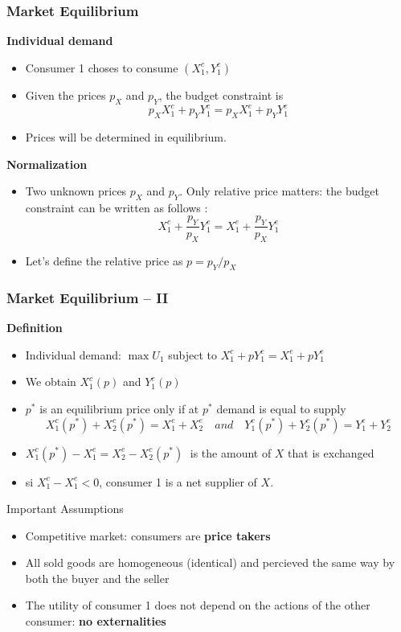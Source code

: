 \documentclass[handout]{beamer}
\newenvironment{iPar}[1]{\textbf{#1} \begin{itemize}}{\end{itemize}}
\newcommand{\mdp}{\medskip \pause}
\begin{document}
\begin{frame}\frametitle{Market Equilibrium}

\begin{iPar}{Individual demand} \item Consumer 1 choses to consume $(X_1^c, Y_1^c)$  \item Given the prices $p_X$ and $p_Y$, the budget constraint is $$  p_X X_1^c + p_Y Y_1^c  =  p_X X_1^e + p_Y Y_1^e$$
\item Prices will be determined in equilibrium.
\end{iPar}\mdp

\begin{iPar}{Normalization}
\item  Two unknown prices $p_X$ and $p_Y$. Only relative price matters: the budget constraint can be written as follows : $$
X_1^c + \frac{p_Y}{p_X} Y_1^c  =   X_1^e + \frac{p_Y}{p_X} Y_1^e$$
\item Let's define the relative price as  $p = p_Y/p_X$  \end{iPar}
\end{frame}

\begin{frame} \frametitle{Market Equilibrium -- II}

\begin{iPar}{Definition} \item Individual demand:  $ \max U_1$ subject to  $ X_1^c + p Y_1^c  =   X_1^e + p Y_1^e$
\item We obtain $X_1^c(p)$ and $Y_1^c(p)$
\item  $p^*$ is an equilibrium price only if at
$p^*$ demand is equal to supply $$X_1^c(p^*)+X_2^c(p^*) = X_1^e + X_2^e \quad
and \quad Y_1^c(p^*)+Y_2^c(p^*) = Y_1^e + Y_2^e  $$ \item $X_1^c(p^*) -
X_1^e =X_2^e - X_2^c(p^*)  \;$  is the amount of $X$ that is exchanged  \item si $X_1^c - X_1^e < 0$, consumer 1 is a net supplier of $X$.\end{iPar}\end{frame}


\begin{frame}{Important Assumptions}
\begin{itemize} \item Competitive market:
consumers are  \textbf{price takers} \item All sold goods are homogeneous (identical) and percieved the same way by both the buyer and the seller \item The utility of consumer 1 does not depend on the actions of the other consumer: \textbf{no externalities} \end{itemize} \end{frame}
\end{document}
